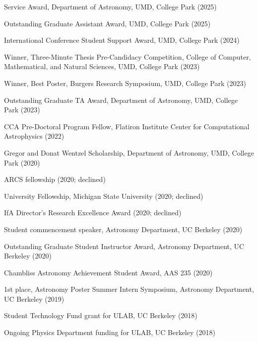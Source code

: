 \item[{\color{numcolor}\scriptsize16}] Service Award, Department of Astronomy, UMD, College Park (2025)


\item[{\color{numcolor}\scriptsize16}] Outstanding Graduate Assistant Award, UMD, College Park (2025)

\item[{\color{numcolor}\scriptsize15}] International Conference Student Support Award, UMD, College Park (2024)

\item[{\color{numcolor}\scriptsize14}] Winner, Three-Minute Thesis Pre-Candidacy Competition, College of Computer, Mathematical, and Natural Sciences, UMD, College Park (2023)

\item[{\color{numcolor}\scriptsize13}] Winner, Best Poster, Burgers Research Symposium, UMD, College Park (2023)

\item[{\color{numcolor}\scriptsize12}] Outstanding Graduate TA Award, Department of Astronomy, UMD, College Park (2023)

\item[{\color{numcolor}\scriptsize11}] CCA Pre-Doctoral Program Fellow, Flatiron Institute Center for Computational Astrophysics (2022)

\item[{\color{numcolor}\scriptsize10}] Gregor and Donat Wentzel Scholarship, Department of Astronomy, UMD, College Park (2020)

\item[{\color{numcolor}\scriptsize9}] ARCS fellowship (2020; declined)

\item[{\color{numcolor}\scriptsize8}] University Fellowship, Michigan State University (2020; declined)

\item[{\color{numcolor}\scriptsize7}] IfA Director's Research Excellence Award (2020; declined)

\item[{\color{numcolor}\scriptsize6}] Student commencement speaker, Astronomy Department, UC Berkeley (2020)

\item[{\color{numcolor}\scriptsize5}] Outstanding Graduate Student Instructor Award, Astronomy Department, UC Berkeley (2020)

\item[{\color{numcolor}\scriptsize4}] Chambliss Astronomy Achievement Student Award, AAS 235 (2020)

\item[{\color{numcolor}\scriptsize3}] 1st place, Astronomy Poster Summer Intern Symposium, Astronomy Department, UC Berkeley (2019)

\item[{\color{numcolor}\scriptsize2}] Student Technology Fund grant for ULAB, UC Berkeley (2018)

\item[{\color{numcolor}\scriptsize1}] Ongoing Physics Department funding for ULAB, UC Berkeley (2018)